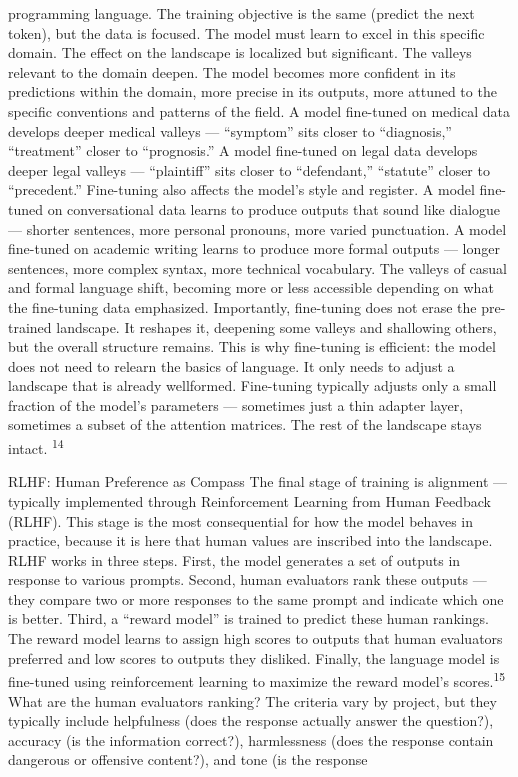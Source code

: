programming language. The training objective is the same (predict the next token), but the data is focused. The model must learn to excel in this specific domain. The effect on the landscape is localized but significant. The valleys relevant to the domain deepen. The model becomes more confident in its predictions within the domain, more precise in its outputs, more attuned to the specific conventions and patterns of the field. A model fine-tuned on medical data develops deeper medical valleys — “symptom” sits closer to “diagnosis,” “treatment” closer to “prognosis.” A model fine-tuned on legal data develops deeper legal valleys — “plaintiff” sits closer to “defendant,” “statute” closer to “precedent.” Fine-tuning also affects the model’s style and register. A model fine-tuned on conversational data learns to produce outputs that sound like dialogue — shorter sentences, more personal pronouns, more varied punctuation. A model fine-tuned on academic writing learns to produce more formal outputs — longer sentences, more complex syntax, more technical vocabulary. The valleys of casual and formal language shift, becoming more or less accessible depending on what the fine-tuning data emphasized. Importantly, fine-tuning does not erase the pre-trained landscape. It reshapes it, deepening some valleys and shallowing others, but the overall structure remains. This is why fine-tuning is efficient: the model does not need to relearn the basics of language. It only needs to adjust a landscape that is already wellformed. Fine-tuning typically adjusts only a small fraction of the model’s parameters — sometimes just a thin adapter layer, sometimes a subset of the attention matrices. The rest of the landscape stays intact. \textsuperscript{14}

RLHF: Human Preference as Compass The final stage of training is alignment — typically implemented through Reinforcement Learning from Human Feedback (RLHF). This stage is the most consequential for how the model behaves in practice, because it is here that human values are inscribed into the landscape. RLHF works in three steps. First, the model generates a set of outputs in response to various prompts. Second, human evaluators rank these outputs — they compare two or more responses to the same prompt and indicate which one is better. Third, a “reward model” is trained to predict these human rankings. The reward model learns to assign high scores to outputs that human evaluators preferred and low scores to outputs they disliked. Finally, the language model is fine-tuned using reinforcement learning to maximize the reward model’s scores.\textsuperscript{15} What are the human evaluators ranking? The criteria vary by project, but they typically include helpfulness (does the response actually answer the question?), accuracy (is the information correct?), harmlessness (does the response contain dangerous or offensive content?), and tone (is the response

